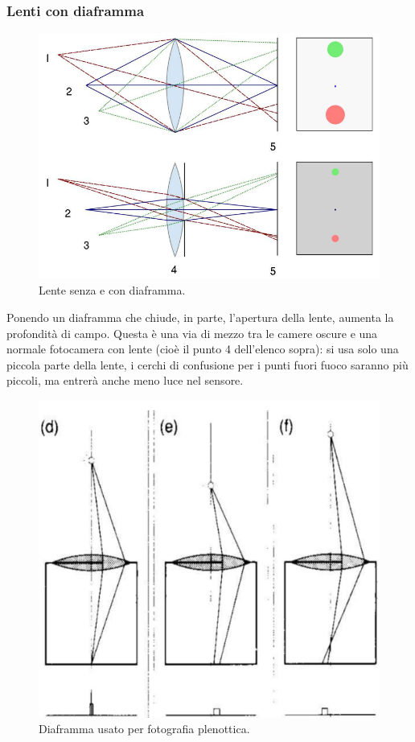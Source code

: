 \documentclass[a4paper,11pt]{article}
\begin{document}
\subsubsection{Lenti con diaframma}
\renewcommand{\thefigure}{3.23}
\begin{figure}[!h]
  \centering
    \includegraphics[scale=0.4]{images/3/diaphragm.png}
    \caption{Lente senza e con diaframma.}
\end{figure}

Ponendo un diaframma che chiude, in parte, l'apertura della lente, aumenta la profondità di campo. Questa è una via di mezzo tra le camere oscure e una normale fotocamera con lente
(cioè il punto 4 dell'elenco sopra): si usa solo una piccola parte della lente, i cerchi di confusione per i punti fuori fuoco saranno più piccoli, ma entrerà anche meno luce nel sensore.

\renewcommand{\thefigure}{3.24}
\begin{figure}[!h]
  \centering
    \includegraphics[scale=0.4]{images/3/partial_pinhole.png}
    \caption{Diaframma usato per fotografia plenottica.}
\end{figure}
\end{document}
